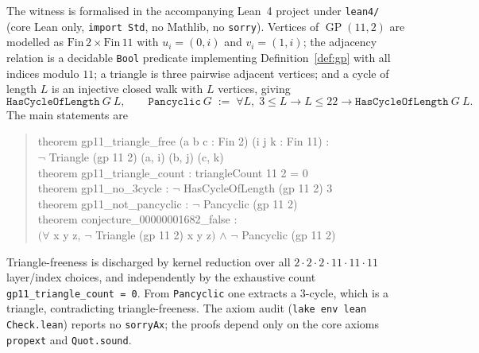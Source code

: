 \documentclass[11pt]{article}
\theoremstyle{definition}
\theoremstyle{remark}
\newcommand{\GP}{\operatorname{GP}}
\begin{document}
The witness is formalised in the accompanying Lean~4 project under
\texttt{lean4/} (core Lean only, \texttt{import Std}, no Mathlib, no
\texttt{sorry}). Vertices of $\GP(11,2)$ are modelled as
$\mathrm{Fin}\,2 \times \mathrm{Fin}\,11$ with $u_i = (0,i)$ and $v_i = (1,i)$;
the adjacency relation is a decidable \texttt{Bool} predicate implementing
Definition~\ref{def:gp} with all indices modulo $11$; a triangle is three
pairwise adjacent vertices; and a cycle of length $L$ is an injective closed
walk with $L$ vertices, giving
\[
\texttt{HasCycleOfLength}\ G\ L,
\qquad
\texttt{Pancyclic}\ G \;:=\; \forall L,\; 3 \le L \to L \le 22 \to
\texttt{HasCycleOfLength}\ G\ L .
\]
The main statements are
\begin{quote}\ttfamily
theorem gp11\_triangle\_free (a b c : Fin 2) (i j k : Fin 11) :\\
\hspace*{2em}$\neg$ Triangle (gp 11 2) (a, i) (b, j) (c, k)\\
theorem gp11\_triangle\_count : triangleCount 11 2 = 0\\
theorem gp11\_no\_3cycle : $\neg$ HasCycleOfLength (gp 11 2) 3\\
theorem gp11\_not\_pancyclic : $\neg$ Pancyclic (gp 11 2)\\
theorem conjecture\_00000001682\_false :\\
\hspace*{2em}$(\forall$ x y z, $\neg$ Triangle (gp 11 2) x y z$)$ $\wedge$ $\neg$ Pancyclic (gp 11 2)
\end{quote}
Triangle-freeness is discharged by kernel reduction over all
$2 \cdot 2 \cdot 2 \cdot 11 \cdot 11 \cdot 11$ layer/index choices, and
independently by the exhaustive count \texttt{gp11\_triangle\_count = 0}. From
\texttt{Pancyclic} one extracts a $3$-cycle, which is a triangle, contradicting
triangle-freeness. The axiom audit (\texttt{lake env lean Check.lean}) reports no
\texttt{sorryAx}; the proofs depend only on the core axioms \texttt{propext} and
\texttt{Quot.sound}.
\end{document}
